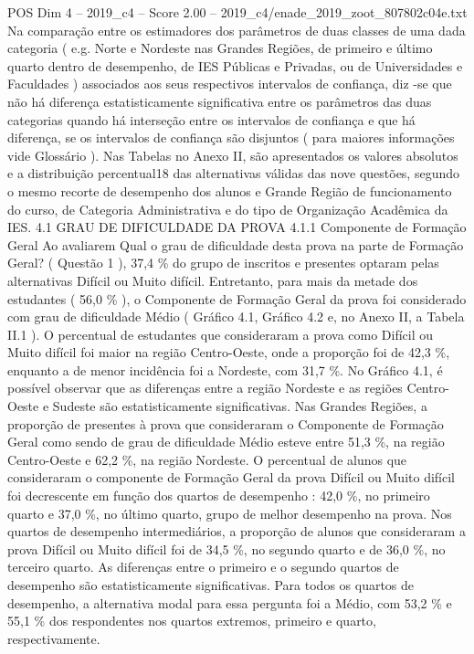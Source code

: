 \begin{textsample}{POS Dim 4 – 2019\_c4 – Score 2.00 – 2019\_c4/enade\_2019\_zoot\_807802c04e.txt}
Na comparação entre os estimadores dos parâmetros de duas classes de uma dada categoria ( e.g.
Norte e Nordeste nas Grandes Regiões, de primeiro e último quarto dentro de desempenho, de IES Públicas e Privadas, ou de Universidades e Faculdades ) associados aos seus respectivos intervalos de confiança, diz -se que não há diferença estatisticamente significativa entre os parâmetros das duas categorias quando há interseção entre os intervalos de confiança e que há diferença, se os intervalos de confiança são disjuntos ( para maiores informações vide Glossário ).
Nas Tabelas no Anexo II, são apresentados os valores absolutos e a distribuição percentual18 das alternativas válidas das nove questões, segundo o mesmo recorte de desempenho dos alunos e Grande Região de funcionamento do curso, de Categoria Administrativa e do tipo de Organização Acadêmica da IES. 4.1 GRAU DE DIFICULDADE DA PROVA 4.1.1 Componente de Formação Geral Ao avaliarem Qual o grau de dificuldade desta prova na parte de Formação Geral? ( Questão 1 ), 37,4 \% do grupo de inscritos e presentes optaram pelas alternativas Difícil ou Muito difícil.
Entretanto, para mais da metade dos estudantes ( 56,0 \% ), o Componente de Formação Geral da prova foi considerado com grau de dificuldade Médio ( Gráfico 4.1, Gráfico 4.2 e, no Anexo II, a Tabela II.1 ).
O percentual de estudantes que consideraram a prova como Difícil ou Muito difícil foi maior na região Centro-Oeste, onde a proporção foi de 42,3 \%, enquanto a de menor incidência foi a Nordeste, com 31,7 \%.
No Gráfico 4.1, é possível observar que as diferenças entre a região Nordeste e as regiões Centro-Oeste e Sudeste são estatisticamente significativas.
Nas Grandes Regiões, a proporção de presentes à prova que consideraram o Componente de Formação Geral como sendo de grau de dificuldade Médio esteve entre 51,3 \%, na região Centro-Oeste e 62,2 \%, na região Nordeste.
O percentual de alunos que consideraram o componente de Formação Geral da prova Difícil ou Muito difícil foi decrescente em função dos quartos de desempenho : 42,0 \%, no primeiro quarto e 37,0 \%, no último quarto, grupo de melhor desempenho na prova.
Nos quartos de desempenho intermediários, a proporção de alunos que consideraram a prova Difícil ou Muito difícil foi de 34,5 \%, no segundo quarto e de 36,0 \%, no terceiro quarto.
As diferenças entre o primeiro e o segundo quartos de desempenho são estatisticamente significativas.
Para todos os quartos de desempenho, a alternativa modal para essa pergunta foi a Médio, com 53,2 \% e 55,1 \% dos respondentes nos quartos extremos, primeiro e quarto, respectivamente.

\end{textsample}
